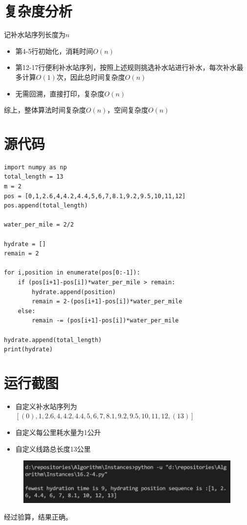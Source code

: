 \documentclass{ctexart}[UTF8]
\begin{document}
    \section{复杂度分析}
    记补水站序列长度为$n$
    \begin{itemize}
        \item 第4-5行初始化，消耗时间$O(n)$
        \item 第12-17行便利补水站序列，按照上述规则挑选补水站进行补水，每次补水最多计算$O(1)$次，因此总时间复杂度$O(n)$
        \item 无需回溯，直接打印，复杂度$O(n)$
    \end{itemize}
    综上，整体算法时间复杂度$O(n)$，空间复杂度$O(n)$
    \section{源代码}
    \begin{lstlisting}
import numpy as np
total_length = 13
m = 2
pos = [0,1,2.6,4,4.2,4.4,5,6,7,8.1,9.2,9.5,10,11,12]
pos.append(total_length)

water_per_mile = 2/2

hydrate = []
remain = 2

for i,position in enumerate(pos[0:-1]):
    if (pos[i+1]-pos[i])*water_per_mile > remain:
        hydrate.append(position)
        remain = 2-(pos[i+1]-pos[i])*water_per_mile
    else:
        remain -= (pos[i+1]-pos[i])*water_per_mile

hydrate.append(total_length)
print(hydrate)
    \end{lstlisting}
    \section{运行截图}
    \begin{itemize}
        \item 自定义补水站序列为$[(0),1,2.6,4,4.2,4.4,5,6,7,8.1,9.2,9.5,10,11,12,(13)]$
        \item 自定义每公里耗水量为1公升
        \item 自定义线路总长度13公里
    \end{itemize}
    \begin{figure}[H]
        \centering
        \includegraphics[width=14cm]{../Resources/9_1.png}
    \end{figure}
    经过验算，结果正确。
\end{document}
